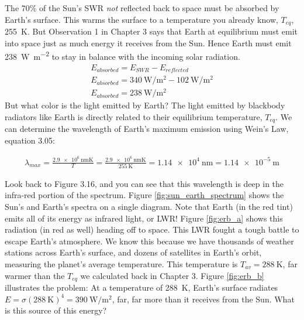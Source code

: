 The 70\% of the Sun's SWR \emph{not} reflected back to space must be absorbed by Earth's surface. This warms the surface to a temperature you already know, $T_{eq}$, \SI{255}{\kelvin}. But Observation 1 in Chapter 3 says that Earth at equilibrium must emit into space just as much energy it receives from the Sun. Hence Earth must emit \SI{238}{\watt\per\m^2} to stay in balance with the incoming solar radiation. 
\begin{align}
	E_{absorbed}=E_{SWR}-E_{reflected}\\
	E_{absorbed}=\SI{340}{\watt\per\m^{2}}-\SI{102}{\watt\per\m^{2}}\\ \label{eq:eabs}
	E_{absorbed}=\SI{238}{\watt\per\m^{2}}
\end{align}
But what color is the light emitted by Earth? The light emitted by blackbody radiators like Earth is directly related to their equilibrium temperature, $T_{eq}$. We can determine the wavelength of Earth's maximum emission using Wein's Law, equation 3.05:
	 
	 \begin{align}
\lambda_{max}=\frac{\SI{2.9e6}{\nano\metre\kelvin}}{T}=	\frac{\SI{2.9e6}{\nano\metre\kelvin}}{\SI{255}{\kelvin}} =\SI{1.14e4}{\nano\metre}=\SI{1.14e-5}{\metre} \label{eq:lambda_earth}
	 \end{align}

Look back to Figure 3.16, and you can see that this wavelength is deep in the infra-red portion of the spectrum. Figure \ref{fig:sun_earth_spectrum} shows the Sun's and Earth's spectra on a single diagram. Note that Earth (in the red tint) emits all of its energy as infrared light, or LWR! Figure \ref{fig:erb_a} shows this radiation (in red as well) heading off to space. This LWR fought a tough battle to escape Earth's atmosphere. We know this because we have thousands of weather stations across Earth's surface, and dozens of satellites in Earth's orbit, measuring the planet's average temperature. This temperature is $T_{av}=\SI{288}{\kelvin}$, far warmer than the $T_{eq}$ we calculated back in Chapter 3. Figure \ref{fig:erb_b} illustrates the problem: At a temperature of \SI{288}{\kelvin}, Earth's surface radiates $E=\sigma (\SI{288}{\kelvin})^4 = \SI{390}{\watt\per\m^2}$, far, far more than it receives from the Sun. What is this source of this energy?\\

